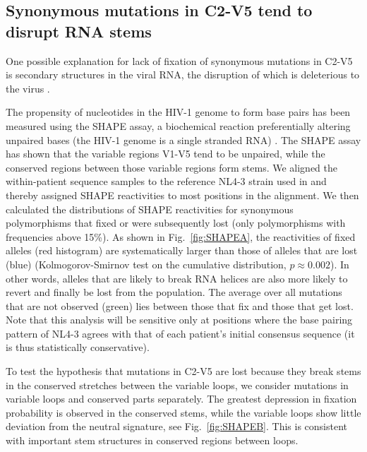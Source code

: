 \documentclass[rmp, twocolumn]{revtex4}
\newcommand{\FIG}[1]{Fig.~\ref{fig:#1}}
\newcommand{\shankaregion}{C2-V5}
\begin{document}
\subsection{Synonymous mutations in \shankaregion{} tend to disrupt RNA stems}
One possible explanation for lack of fixation of synonymous mutations in
\shankaregion{} is secondary structures in the viral RNA, the disruption of which
is deleterious to the virus \citep{forsdyke_reciprocal_1995,
snoeck_mapping_2011, sanjuan_interplay_2011}.

The propensity of nucleotides in the HIV-1 genome to form base pairs has been
measured using the SHAPE assay, a biochemical reaction preferentially altering
unpaired bases (the HIV-1 genome is a single stranded RNA)
\citep{watts_architecture_2009}. The SHAPE assay has shown that the variable
regions V1-V5 tend to be unpaired, while the conserved regions between those
variable regions form stems.  We aligned the within-patient sequence samples 
to the reference NL4-3 strain used in \citet{watts_architecture_2009} and 
thereby assigned SHAPE reactivities to most positions in the alignment. 
We then calculated the distributions of SHAPE reactivities for synonymous 
polymorphisms that fixed or were subsequently lost (only polymorphisms with 
frequencies above 15\%).
As shown in \FIG{SHAPEA}, the reactivities of fixed alleles (red
histogram) are systematically larger than those of alleles that are lost (blue)
(Kolmogorov-Smirnov test on the cumulative distribution, $p\approx 0.002$). In
other words, alleles that are likely to break RNA helices are also more likely
to revert and finally be lost from the population. The average over all
mutations that are not observed (green) lies between  those that fix and
those that get lost. Note that this analysis will be sensitive only at positions
where the base pairing pattern of NL4-3 agrees with that of each patient's
initial consensus sequence (it is thus statistically conservative).

To test the hypothesis that mutations in \shankaregion{} are lost because they
break stems in the conserved stretches between the variable loops, we consider
mutations in variable loops and conserved parts separately. The greatest
depression in fixation probability is observed in the conserved stems, while the
variable loops show little deviation from the neutral signature, see
\FIG{SHAPEB}. This is consistent with important stem structures in conserved
regions between loops.
\end{document}
